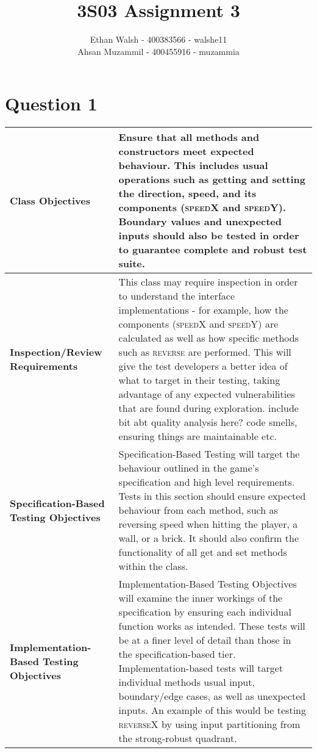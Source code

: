 \documentclass{article}
\title{3S03 Assignment 3}
\author{Ethan Walsh - 400383566 - walshe11 \\ Ahsan Muzammil - 400455916 - muzammia}
\begin{document}
\maketitle
\newpage
\section*{Question 1}

\begin{table}[h]
    \renewcommand{\arraystretch}{1.2}
    \setlength{\extrarowheight}{2pt} 
    \centering
    \begin{tabularx}{\textwidth}{ |X|X| } 
        \hline
        \textbf{Class Objectives} & Ensure that all methods and constructors meet expected behaviour. This includes usual operations such as getting and setting the direction, speed, and its components (\textsc{speedX} and \textsc{speedY}). Boundary values and unexpected inputs should also be tested in order to guarantee complete and robust test suite. \\ 
        \hline
        \textbf{Inspection/Review Requirements} & This class may require inspection in order to understand the interface implementations - for example, how the components (\textsc{speedX} and \textsc{speedY}) are calculated as well as how specific methods such as \textsc{reverse} are performed. This will give the test developers a better idea of what to target in their testing, taking advantage of any expected vulnerabilities that are found during exploration. include bit abt quality analysis here? code smells, ensuring things are maintainable etc. \\ 
        \hline
        \textbf{Specification-Based Testing Objectives} & Specification-Based Testing will target the behaviour outlined in the game's specification and high level requirements. Tests in this section should ensure expected behaviour from each method, such as reversing speed when hitting the player, a wall, or a brick. It should also confirm the functionality of all get and set methods within the class. \\ 
        \hline
        \textbf{Implementation-Based Testing Objectives} & Implementation-Based Testing Objectives will examine the inner workings of the specification by ensuring each individual function works as intended. These tests will be at a finer level of detail than those in the specification-based tier. Implementation-based tests will target individual methods usual input, boundary/edge cases, as well as unexpected inputs. An example of this would be testing \textsc{reverseX} by using input partitioning from the strong-robust quadrant.  \\ 

\end{tabularx}
\end{table}
\end{document}
